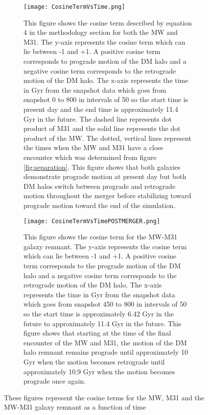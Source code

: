 \documentclass[fleqn,usenatbib]{mnras}
\begin{document}
\begin{figure}
\centering
\begin{subfigure}[b]{0.5\textwidth}
    \centering
    \texttt{[image: CosineTermVsTime.png]}
    \caption{This figure shows the cosine term described by equation 4 in the methodology section for both the MW and M31. The y-axis represents the cosine term which can lie between -1 and +1. A positive cosine term corresponds to prograde motion of the DM halo and a negative cosine term corresponds to the retrograde motion of the DM halo. The x-axis represents the time in Gyr from the snapshot data which goes from snapshot 0 to 800 in intervals of 50 so the start time is present day and the end time is approximately 11.4 Gyr in the future. The dashed line represents dot product of M31 and the solid line represents the dot product of the MW. The dotted, vertical lines represent the times when the MW and M31 have a close encounter which was determined from figure \ref{fig:separation}. This figure shows that both galaxies demonstrate prograde motion at present day but both DM halos switch between prograde and retrograde motion throughout the merger before stabilizing toward prograde motion toward the end of the simulation.}
    \label{fig:cosinePRE}
\end{subfigure}
\begin{subfigure}[b]{0.5\textwidth}              
    \centering
    \texttt{[image: CosineTermVsTimePOSTMERGER.png]}
    \caption{This figure shows the cosine term for the MW-M31 galaxy remnant. The y-axis represents the cosine term which can lie between -1 and +1. A positive cosine term corresponds to the prograde motion of the DM halo and a negative cosine term corresponds to the retrograde motion of the DM halo. The x-axis represents the time in Gyr from the snapshot data which goes from snapshot 450 to 800 in intervals of 50 so the start time is approximately 6.42 Gyr in the future to approximately 11.4 Gyr in the future. This figure shows that starting at the time of the final encounter of the MW and M31, the motion of the DM halo remnant remains prograde until approximately 10 Gyr when the motion becomes retrograde until approximately 10.9 Gyr when the motion becomes prograde once again.}
    \label{fig:cosinePOST}
\end{subfigure}
\caption{These figures represent the cosine terms for the MW, M31 and the MW-M31 galaxy remnant as a function of time}
\end{figure}
\end{document}
